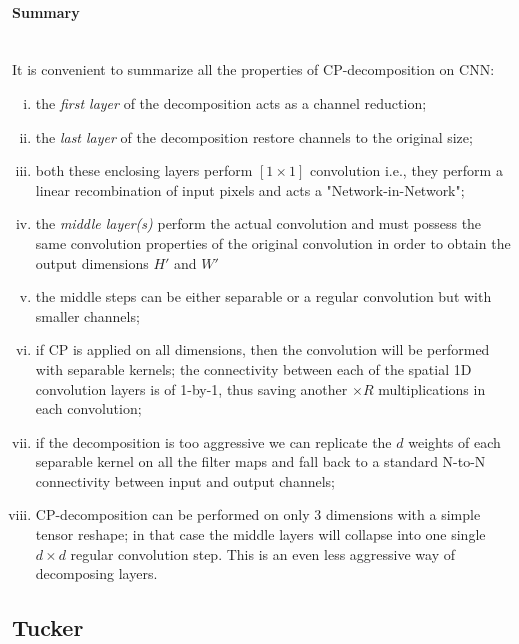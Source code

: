 \paragraph{Summary}\\
It is convenient to summarize all the properties of CP-decomposition on CNN: 
\begin{enumerate}[(i)]
	\item the \emph{first layer} of the decomposition acts as a channel reduction;
	
	\item the \emph{last layer} of the decomposition restore channels to the original size; 
	
	\item both these enclosing layers perform $[1 \times 1]$ convolution i.e., they perform a linear recombination of input pixels and acts a "Network-in-Network";
	
	\item the \emph{middle layer(s)} perform the actual convolution and must possess the same convolution properties of the original convolution in order to obtain the output dimensions $H'$ and $W'$
	
	\item the middle steps can be either separable or a regular convolution but with smaller channels; 
	
	\item if CP is applied on all dimensions, then the convolution will be performed with separable kernels; the connectivity between each of the spatial 1D convolution layers is of 1-by-1, thus saving another $\times R$ multiplications in each convolution; 
	
	\item if the decomposition is too aggressive we can replicate the $d$ weights of each separable kernel on all the filter maps and fall back to a standard N-to-N connectivity between input and output channels; 
	
	\item CP-decomposition can be performed on only 3 dimensions with a simple tensor reshape; in that case the middle layers will collapse into one single $d \times d$ regular convolution step. This is an even less aggressive way of decomposing layers. 
 
\end{enumerate}

\subsection{Tucker}



